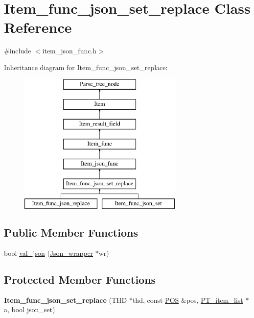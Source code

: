 \hypertarget{classItem__func__json__set__replace}{}\section{Item\+\_\+func\+\_\+json\+\_\+set\+\_\+replace Class Reference}
\label{classItem__func__json__set__replace}


{\ttfamily \#include $<$item\+\_\+json\+\_\+func.\+h$>$}

Inheritance diagram for Item\+\_\+func\+\_\+json\+\_\+set\+\_\+replace\+:\begin{figure}[H]
\begin{center}
\leavevmode
\includegraphics[height=7.000000cm]{classItem__func__json__set__replace}
\end{center}
\end{figure}
\subsection*{Public Member Functions}
\begin{DoxyCompactItemize}
\item 
bool \mbox{\hyperlink{classItem__func__json__set__replace_a01112442d94a21e1495f34f418fbf9e0}{val\+\_\+json}} (\mbox{\hyperlink{classJson__wrapper}{Json\+\_\+wrapper}} $\ast$wr)
\end{DoxyCompactItemize}
\subsection*{Protected Member Functions}
\begin{DoxyCompactItemize}
\item 
\mbox{\label{classItem__func__json__set__replace_a2642b44ff82c1e48215d1f2c2a075019}} 
{\bfseries Item\+\_\+func\+\_\+json\+\_\+set\+\_\+replace} (T\+HD $\ast$thd, const \mbox{\hyperlink{structYYLTYPE}{P\+OS}} \&pos, \mbox{\hyperlink{classPT__item__list}{P\+T\+\_\+item\+\_\+list}} $\ast$a, bool json\+\_\+set)
\end{DoxyCompactItemize}
